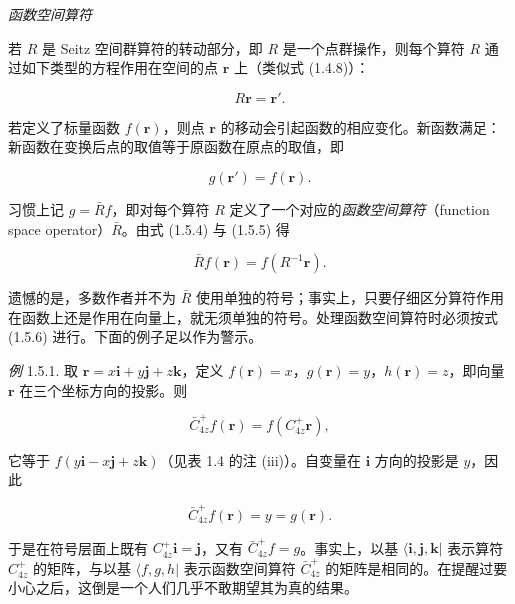 \textit{函数空间算符}

若 $R$ 是 Seitz 空间群算符的转动部分，即 $R$ 是一个点群操作，则每个算符 $R$ 通过如下类型的方程作用在空间的点 $\mathbf{r}$ 上（类似式 (1.4.8)）：

\begin{equation*}
R\mathbf{r} = \mathbf{r}'.
\tag{1.5.4}
\end{equation*}

若定义了标量函数 $f(\mathbf{r})$，则点 $\mathbf{r}$ 的移动会引起函数的相应变化。新函数满足：新函数在变换后点的取值等于原函数在原点的取值，即

\begin{equation*}
g(\mathbf{r}') = f(\mathbf{r}).
\tag{1.5.5}
\end{equation*}

习惯上记 $g = \bar{R}f$，即对每个算符 $R$ 定义了一个对应的\textit{函数空间算符}（function space operator）$\bar{R}$。由式 (1.5.4) 与 (1.5.5) 得

\begin{equation*}
\bar{R}f(\mathbf{r}) = f(R^{-1}\mathbf{r}).
\tag{1.5.6}
\end{equation*}

遗憾的是，多数作者并不为 $\bar{R}$ 使用单独的符号；事实上，只要仔细区分算符作用在函数上还是作用在向量上，就无须单独的符号。处理函数空间算符时必须按式 (1.5.6) 进行。下面的例子足以作为警示。

\textit{例} 1.5.1. 取 $\mathbf{r} = x\mathbf{i} + y\mathbf{j} + z\mathbf{k}$，定义 $f(\mathbf{r}) = x$，$g(\mathbf{r}) = y$，$h(\mathbf{r}) = z$，即向量 $\mathbf{r}$ 在三个坐标方向的投影。则

\begin{equation*}
\bar{C}_{4z}^{+}f(\mathbf{r}) = f(C_{4z}^{+}\mathbf{r}),
\tag{1.5.7}
\end{equation*}

它等于 $f(y\mathbf{i} - x\mathbf{j} + z\mathbf{k})$（见表 1.4 的注 (iii)）。自变量在 $\mathbf{i}$ 方向的投影是 $y$，因此

\begin{equation*}
\bar{C}_{4z}^{+}f(\mathbf{r}) = y = g(\mathbf{r}).
\tag{1.5.8}
\end{equation*}

于是在符号层面上既有 $C_{4z}^{+}\mathbf{i} = \mathbf{j}$，又有 $\bar{C}_{4z}^{+}f = g$。事实上，以基 $\langle \mathbf{i}, \mathbf{j}, \mathbf{k}|$ 表示算符 $C_{4z}^{+}$ 的矩阵，与以基 $\langle f, g, h|$ 表示函数空间算符 $\bar{C}_{4z}^{+}$ 的矩阵是相同的。在提醒过要小心之后，这倒是一个人们几乎不敢期望其为真的结果。

